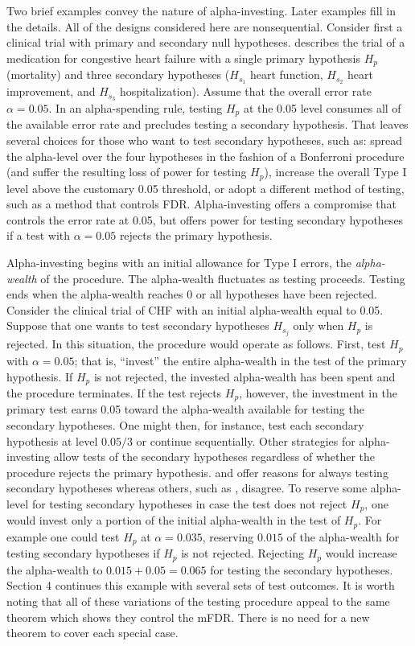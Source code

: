 \documentclass[12pt]{article}
\begin{document}
 Two brief examples convey the nature of alpha-investing.  Later examples fill
 in the details.  All of the designs considered here are nonsequential.
  Consider first a clinical trial with primary and secondary null hypotheses.
  \citet{moye00} describes the trial of a medication for congestive heart
 failure with a single primary hypothesis $H_p$ (mortality) and three secondary
 hypotheses ($H_{s_1}$ heart function, $H_{s_2}$ heart improvement, and
 $H_{s_3}$ hospitalization).  Assume that the overall error rate $\alpha =
 0.05$.  In an alpha-spending rule, testing $H_p$ at the 0.05 level consumes all
 of the available error rate and precludes testing a secondary hypothesis.  That
 leaves several choices for those who want to test secondary hypotheses, such
 as: spread the alpha-level over the four hypotheses in the fashion of a
 Bonferroni procedure (and suffer the resulting loss of power for testing
 $H_p$), increase the overall Type I level above the customary 0.05 threshold,
 or adopt a different method of testing, such as a method that controls FDR.
  Alpha-investing offers a compromise that controls the error rate at 0.05, but
 offers power for testing secondary hypotheses if a test with $\alpha = 0.05$
 rejects the primary hypothesis.


 Alpha-investing begins with an initial allowance for Type I errors, the {\em
 alpha-wealth} of the procedure.  The alpha-wealth fluctuates as testing
 proceeds.  Testing ends when the alpha-wealth reaches 0 or all hypotheses have
 been rejected.  Consider the clinical trial of CHF with an initial alpha-wealth
 equal to 0.05.  Suppose that one wants to test secondary hypotheses $H_{s_j}$
 only when $H_p$ is rejected.  In this situation, the procedure would operate as
 follows.  First, test $H_p$ with $\alpha = 0.05$; that is, ``invest'' the
 entire alpha-wealth in the test of the primary hypothesis.  If $H_p$ is not
 rejected, the invested alpha-wealth has been spent and the procedure
 terminates.  If the test rejects $H_p$, however, the investment in the primary
 test earns 0.05 toward the alpha-wealth available for testing the secondary
 hypotheses.  One might then, for instance, test each secondary hypothesis at
 level $0.05/3$ or continue sequentially.  Other strategies for alpha-investing
 allow tests of the secondary hypotheses regardless of whether the procedure
 rejects the primary hypothesis. \citet{dagostino00} and \citet{turk08} offer
 reasons for always testing secondary hypotheses whereas others, such as
 \citet{oneill97}, disagree.  To reserve some alpha-level for testing secondary
 hypotheses in case the test does not reject $H_p$, one would invest only a
 portion of the initial alpha-wealth in the test of $H_p$.  For example one
 could test $H_p$ at $\alpha = 0.035$, reserving $0.015$ of the alpha-wealth for
 testing secondary hypotheses if $H_p$ is not rejected.  Rejecting $H_p$ would
 increase the alpha-wealth to $0.015+0.05 = 0.065$ for testing the secondary
 hypotheses.  Section 4 continues this example with several sets of test
 outcomes.  It is worth noting that all of these variations of the testing
 procedure appeal to the same theorem which shows they control the mFDR.  There
 is no need for a new theorem to cover each special case.
 
\end{document}
